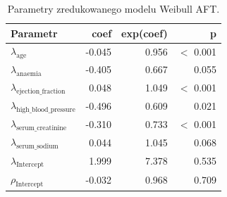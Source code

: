 \begin{table}[htbp]
\centering
\caption{Parametry zredukowanego modelu Weibull AFT.}
\label{tab:aft-red}
\scriptsize
\setlength{\tabcolsep}{1.5pt}
\begin{tabular}{lrrr}
\toprule
Parametr & coef & exp(coef) & p \\
\midrule
$\lambda_{\mathrm{age}}$ & -0.045 & 0.956 & $<$ 0.001 \\
$\lambda_{\mathrm{anaemia}}$ & -0.405 & 0.667 & 0.055 \\
$\lambda_{\mathrm{ejection\_fraction}}$ & 0.048 & 1.049 & $<$ 0.001 \\
$\lambda_{\mathrm{high\_blood\_pressure}}$ & -0.496 & 0.609 & 0.021 \\
$\lambda_{\mathrm{serum\_creatinine}}$ & -0.310 & 0.733 & $<$ 0.001 \\
$\lambda_{\mathrm{serum\_sodium}}$ & 0.044 & 1.045 & 0.068 \\
$\lambda_{\mathrm{Intercept}}$ & 1.999 & 7.378 & 0.535 \\
$\rho_{\mathrm{Intercept}}$ & -0.032 & 0.968 & 0.709 \\
\bottomrule
\end{tabular}
\end{table}
